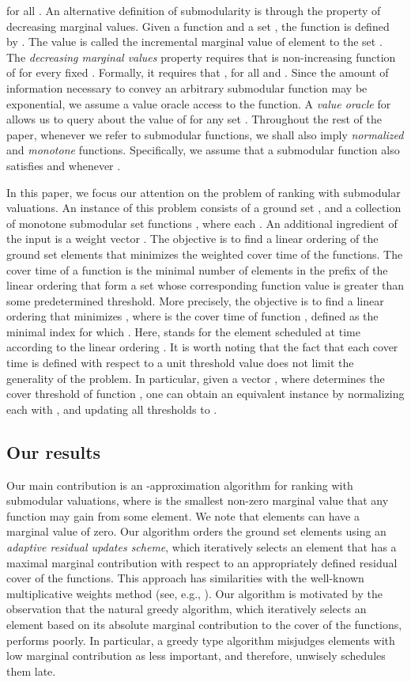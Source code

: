 \documentclass[11pt]{article}
\theoremstyle{plain}
\theoremstyle{definition}
\begin{document}
for all . An alternative definition of
submodularity is through the property of decreasing marginal
values. Given a function  and a set
, the function  is defined by . The value  is called the incremental
marginal value of element  to the set . The \emph{decreasing
marginal values} property requires that  is non-increasing
function of  for every fixed . Formally, it requires that
, for all  and . Since the amount of information necessary to convey
an arbitrary submodular function may be exponential, we assume a
value oracle access to the function. A \emph{value oracle} for 
allows us to query about the value of  for any set .
Throughout the rest of the paper, whenever we refer to submodular
functions, we shall also imply \emph{normalized} and
\emph{monotone} functions. Specifically, we assume that a
submodular function  also satisfies  and
 whenever .

In this paper, we focus our attention on the problem of ranking
with submodular valuations. An instance of this problem consists
of a ground set , and a collection of  monotone submodular
set functions , where each . An additional ingredient of the input is a weight vector
. The objective is to find a linear ordering of
the ground set elements that minimizes the weighted cover time of
the functions. The cover time of a function is the minimal number
of elements in the prefix of the linear ordering that form a set
whose corresponding function value is greater than some
predetermined threshold. More precisely, the objective is to find
a linear ordering  that minimizes , where  is the cover time of function ,
defined as the minimal index for which . Here,  stands for the element
scheduled at time  according to the linear ordering . It
is worth noting that the fact that each cover time is defined with
respect to a unit threshold value does not limit the generality of
the problem. In particular, given a vector ,
where  determines the cover threshold of function
, one can obtain an equivalent instance by normalizing each
 with , and updating all thresholds to .


\subsection{Our results}

Our main contribution is an -approximation
algorithm for ranking with submodular valuations, where  is the smallest non-zero marginal value
that any function may gain from some element. We note that
elements can have a marginal value of zero. Our algorithm orders
the ground set elements using an \emph{adaptive residual updates
scheme}, which iteratively selects an element that has a maximal
marginal contribution with respect to an appropriately defined
residual cover of the functions. This approach has similarities
with the well-known multiplicative weights method (see, e.g.,
\cite{PlotkinST95,GargK07}). Our algorithm is motivated by the
observation that the natural greedy algorithm, which iteratively
selects an element based on its absolute marginal contribution to
the cover of the functions, performs poorly. In particular, a
greedy type algorithm misjudges elements with low marginal
contribution as less important, and therefore, unwisely schedules
them late.
\end{document}
